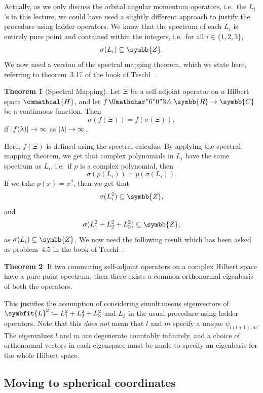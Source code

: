 \documentclass[12pt, a4 paper]{article}
\renewcommand{\symcal}{\cmmathcal}
\theoremstyle{definition}
\newtheorem{thm}{Theorem}
\newcommand{\rr}{\symbb{R}}
\newcommand{\cc}{\symbb{C}}
\newcommand{\zz}{\symbb{Z}}
\newcommand{\hilbert}{\symcal{H}}
\newcommand{\spec}{\sigma}
\DeclarePairedDelimiter{\abs}{\lvert}{\rvert}
\renewcommand{\colon}{\nobreak\mskip2mu\mathpunct{}\nonscript
  \mkern-\thinmuskip{\Umathchar"6 "0 "3A}\mskip6muplus1mu\relax}
\begin{document}
    Actually, as we only discuss the orbital angular momentum operators, i.e.\ the \(L_i\)'s in this lecture, we could have used a slightly different approach to justify the procedure using ladder operators. We know that the spectrum of each \(L_i\) is entirely pure point and contained within the integers, i.e.\ for all \(i \in \{1, 2, 3\}\),
    \[
        \spec(L_i) \subseteq \zz.
    \]
    We now need a version of the spectral mapping theorem, which we state here, referring to theorem~3.17 of the book of Teschl~\cite[p.~118]{Teschl}.
    \begin{thm}[Spectral Mapping]
        Let \(\Xi\) be a self-adjoint operator on a Hilbert space \(\hilbert\), and let \(f \colon \rr \rightarrow \cc\) be a continuous function. Then
        \[
            \spec(f(\Xi)) = f(\spec(\Xi)),
        \]
        if \(\abs{f(\lambda)} \rightarrow \infty\) as \(\abs{\lambda} \rightarrow \infty\).
    \end{thm}
    Here, \(f(\Xi)\) is defined using the spectral calculus. By applying the spectral mapping theorem, we get that complex polynomials in \(L_i\) have the same spectrum as \(L_i\), i.e.\ if \(p\) is a complex polynomial, then
    \[
        \spec(p(L_i)) = p(\spec(L_i)).
    \]
    If we take \(p(x) = x^2\), then we get that \[\spec(L_i^2) \subseteq \zz,\] and \[\spec(L_1^2 + L_2^2 + L_3^2) \subseteq \zz,\] as \(\spec(L_i) \subseteq \zz\). We now need the following result which has been asked as problem~4.5 in the book of Teschl~\cite[p.~138]{Teschl}.
    \begin{thm}
        If two commuting self-adjoint operators on a complex Hilbert space have a pure point spectrum, then there exists a common orthonormal eigenbasis of both the operators.
    \end{thm}
    This justifies the assumption of considering simultaneous eigenvectors of \(\symbfit{L}^2 \coloneq L_1^2 + L_2^2 + L_3^2\) and \(L_3\) in the usual procedure using ladder operators. Note that this \textit{does not} mean that \(l\) and \(m\) specify a unique \(\psi_{l(l+1), m}\). The eigenvalues \(l\) and \(m\) are degenerate countably infinitely, and a choice of orthonormal vectors in each eigenspace must be made to specify an eigenbasis for the whole Hilbert space.

    \subsection{Moving to spherical coordinates}
\end{document}
